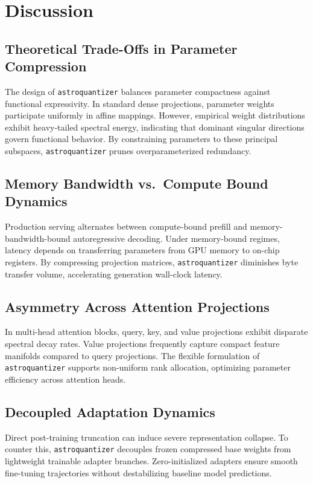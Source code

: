 \section{Discussion}

\subsection{Theoretical Trade-Offs in Parameter Compression}
The design of \texttt{astroquantizer} balances parameter compactness against functional expressivity. In standard dense projections, parameter weights participate uniformly in affine mappings. However, empirical weight distributions exhibit heavy-tailed spectral energy, indicating that dominant singular directions govern functional behavior. By constraining parameters to these principal subspaces, \texttt{astroquantizer} prunes overparameterized redundancy.

\subsection{Memory Bandwidth vs.\ Compute Bound Dynamics}
Production serving alternates between compute-bound prefill and memory-bandwidth-bound autoregressive decoding. Under memory-bound regimes, latency depends on transferring parameters from GPU memory to on-chip registers. By compressing projection matrices, \texttt{astroquantizer} diminishes byte transfer volume, accelerating generation wall-clock latency.

\subsection{Asymmetry Across Attention Projections}
In multi-head attention blocks, query, key, and value projections exhibit disparate spectral decay rates. Value projections frequently capture compact feature manifolds compared to query projections. The flexible formulation of \texttt{astroquantizer} supports non-uniform rank allocation, optimizing parameter efficiency across attention heads.

\subsection{Decoupled Adaptation Dynamics}
Direct post-training truncation can induce severe representation collapse. To counter this, \texttt{astroquantizer} decouples frozen compressed base weights from lightweight trainable adapter branches. Zero-initialized adapters ensure smooth fine-tuning trajectories without destabilizing baseline model predictions.


